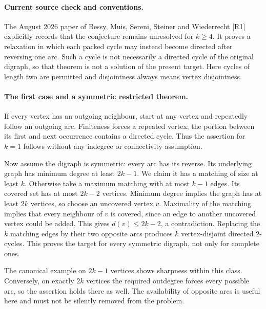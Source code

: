\documentclass[11pt,a4paper]{article}
\begin{document}
\paragraph{Current source check and conventions.}
The August 2026 paper of Bessy, Muis, Sereni, Steiner and Wiederrecht
[R1] explicitly records that the conjecture remains unresolved for
$k\ge4$. It proves a relaxation in which each packed cycle may instead
become directed after reversing one arc. Such a cycle is not necessarily
a directed cycle of the original digraph, so that theorem is not a
solution of the present target. Here cycles of length two are permitted
and disjointness always means vertex disjointness.

\paragraph{The first case and a symmetric restricted theorem.}
If every vertex has an outgoing neighbour, start at any vertex and
repeatedly follow an outgoing arc. Finiteness forces a repeated vertex;
the portion between its first and next occurrence contains a directed
cycle. Thus the assertion for $k=1$ follows without any indegree or
connectivity assumption.

Now assume the digraph is symmetric: every arc has its reverse. Its
underlying graph has minimum degree at least $2k-1$. We claim it has
a matching of size at least $k$. Otherwise take a maximum matching
with at most $k-1$ edges. Its covered set has at most $2k-2$ vertices.
Minimum degree implies the graph has at least $2k$ vertices, so choose
an uncovered vertex $v$. Maximality of the matching implies that every
neighbour of $v$ is covered, since an edge to another uncovered vertex
could be added. This gives $d(v)\le2k-2$, a contradiction. Replacing
the $k$ matching edges by their two opposite arcs produces $k$
vertex-disjoint directed 2-cycles. This proves the target for every
symmetric digraph, not only for complete ones.

The canonical example on $2k-1$ vertices shows sharpness within this
class. Conversely, on exactly $2k$ vertices the required outdegree
forces every possible arc, so the assertion holds there as well.
The availability of opposite arcs is useful here and must not be
silently removed from the problem.
\end{document}
